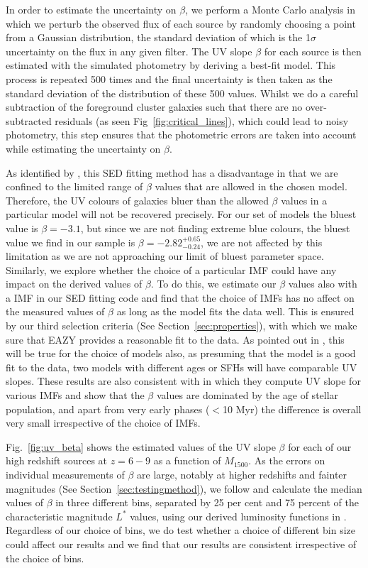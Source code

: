\documentclass[twocolumn]{aastex63}
\begin{document}
In order to estimate the uncertainty on $\beta$, we perform a Monte Carlo analysis in which we perturb the observed flux of each source by randomly choosing a point from a Gaussian distribution, the standard deviation of which is the 1$\sigma$ uncertainty on the flux in any given filter. The UV slope $\beta$ for each source is then estimated with the simulated photometry by deriving a best-fit model. This process is repeated 500 times and the final uncertainty is then taken as the standard deviation of the distribution of these 500 values. Whilst we do a careful subtraction of the foreground cluster galaxies such that there are no over-subtracted residuals (as seen Fig~\ref{fig:critical_lines}), which could lead to noisy photometry, this step ensures that the photometric errors are taken into account while estimating the uncertainty on $\beta$.

As identified by \citet{Finkelstein2012}, this SED fitting method has a disadvantage in that we are confined to the limited range of $\beta$ values that are allowed in the chosen model. Therefore, the UV colours of galaxies bluer than the allowed $\beta$ values in a particular model will not be recovered precisely. For our set of models the bluest value is $\beta=-3.1$, but since we are not finding extreme blue colours, the bluest value we find in our sample is $\beta=-2.82_{-0.24}^{+0.65}$, we are not affected by this limitation as we are not approaching our limit of bluest parameter space. Similarly, we explore whether the choice of a particular IMF could have any impact on the derived values of $\beta$. To do this, we estimate our $\beta$ values also with a \citet{Salpeter1955} IMF in our SED fitting code and find that the choice of IMFs has no affect on the measured values of $\beta$ as long as the model fits the data well. This is ensured by our third selection criteria (See Section~\ref{sec:properties}), with which we make sure that EAZY provides a reasonable fit to the data. As pointed out in \citet{Finkelstein2012}, this will be true for the choice of models also, as presuming that the model is a good fit to the data, two models with different ages or SFHs will have comparable UV slopes. These results are also consistent with \citet{Jerabkova2017} in which they compute UV slope for various IMFs and show that the $\beta$ values are dominated by the age of stellar population, and apart from very early phases ($<$10 Myr) the difference is overall very small irrespective of the choice of IMFs.


Fig.~\ref{fig:uv_beta} shows the estimated values of the UV slope $\beta$ for each of our high redshift sources at $z=6-9$ as a function of $M_{\mathrm{1500}}$. As the errors on individual measurements of $\beta$ are large, notably at higher redshifts and fainter magnitudes (See Section~\ref{sec:testingmethod}), we follow \citet{Finkelstein2012} and calculate the median values of $\beta$ in three different bins, separated by 25 per cent and 75 percent of the characteristic magnitude $L^{*}$ values, using our derived luminosity functions in \citet{Bhatawdekar2019}. Regardless of our choice of bins, we do test whether a choice of different bin size could affect our results and we find that our results are consistent irrespective of the choice of bins.
\end{document}
